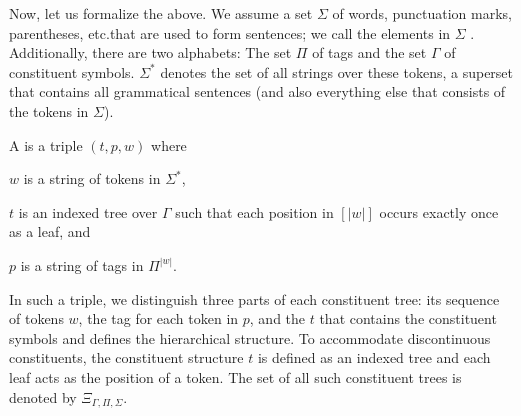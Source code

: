 \documentclass[../document.tex]{subfiles}
\begin{document}
    Now, let us formalize the above.
    We assume a set \(\varSigma\) of words, punctuation marks, parentheses, etc.\@ that are used to form sentences; we call the elements in \(\varSigma\) .
    Additionally, there are two alphabets: The set \(\varPi\) of  tags and the set \(\varGamma\) of constituent symbols.
    \(\varSigma^*\) denotes the set of all strings over these tokens, a superset that contains all grammatical sentences (and also everything else that consists of the tokens in \(\varSigma\)).

    A  is a triple \((t, p, w)\) where
    \begin{compactitem}
        \item \(w\) is a string of tokens in \(\varSigma^*\),
        \item \(t\) is an indexed tree over \(\varGamma\) such that each position in \([|w|]\) occurs exactly once as a leaf, and
        \item \(p\) is a string of  tags in \(\varPi^{|w|}\).
    \end{compactitem}
    In such a triple, we distinguish three parts of each constituent tree: its sequence of tokens \(w\), the  tag for each token in \(p\), and the  \(t\) that contains the constituent symbols and defines the hierarchical structure.
    To accommodate discontinuous constituents, the constituent structure \(t\) is defined as an indexed tree and each leaf acts as the position of a token.
    The set of all such constituent trees is denoted by \(\Xi_{\varGamma, \varPi, \varSigma}\).
\end{document}
